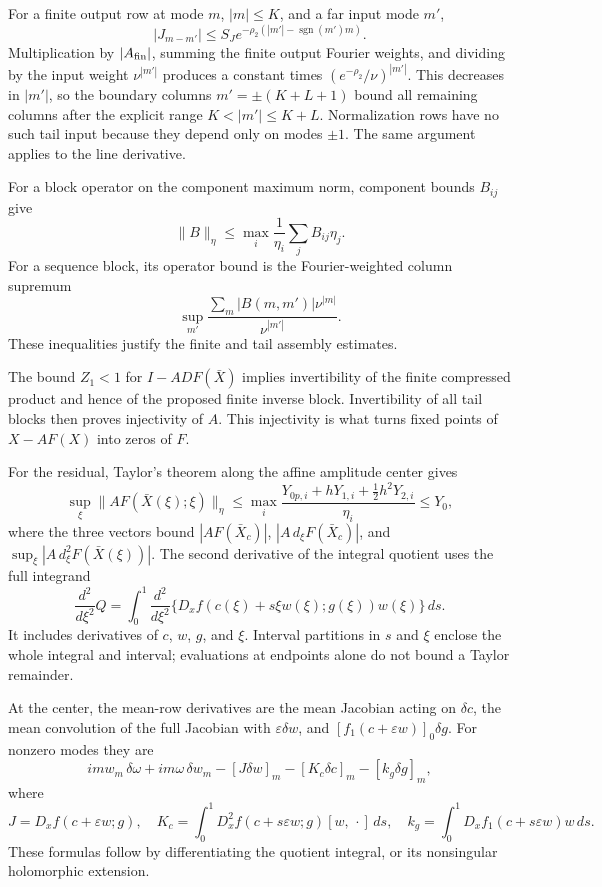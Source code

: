 \documentclass[11pt]{article}
\theoremstyle{definition}
\begin{document}
For a finite output row at mode $m$, $|m|\le K$, and a far input mode $m'$,
\[
 |J_{m-m'}|\le S_J
  e^{-\rho_2(|m'|-\operatorname{sgn}(m')m)}.
\]
Multiplication by $|A_{\rm fin}|$, summing the finite output Fourier weights, and dividing by the input weight $\nu^{|m'|}$ produces a constant times $(e^{-\rho_2}/\nu)^{|m'|}$. This decreases in $|m'|$, so the boundary columns $m'=\pm(K+L+1)$ bound all remaining columns after the explicit range $K<|m'|\le K+L$. Normalization rows have no such tail input because they depend only on modes $\pm1$. The same argument applies to the line derivative.

For a block operator on the component maximum norm, component bounds $B_{ij}$ give
\[
 \|B\|_\eta\le\max_i\frac1{\eta_i}\sum_jB_{ij}\eta_j.
\]
For a sequence block, its operator bound is the Fourier-weighted column supremum
\[
 \sup_{m'}\frac{\sum_m|B(m,m')|\nu^{|m|}}{\nu^{|m'|}}.
\]
These inequalities justify the finite and tail assembly estimates.

The bound $Z_1<1$ for $I-ADF(\bar X)$ implies invertibility of the finite compressed product and hence of the proposed finite inverse block. Invertibility of all tail blocks then proves injectivity of $A$. This injectivity is what turns fixed points of $X-AF(X)$ into zeros of $F$.

For the residual, Taylor's theorem along the affine amplitude center gives
\[
 \sup_{\xi}\|AF(\bar X(\xi);\xi)\|_\eta
 \le \max_i\frac{Y_{0p,i}+hY_{1,i}
                       +\frac12h^2Y_{2,i}}{\eta_i}\le Y_0,
\]
where the three vectors bound $|AF(\bar X_c)|$,
$|A\,d_\xi F(\bar X_c)|$, and
$\sup_\xi|A\,d_\xi^2F(\bar X(\xi))|$.
The second derivative of the integral quotient uses the full integrand
\[
 \frac{d^2}{d\xi^2}Q
 =\int_0^1\frac{d^2}{d\xi^2}
   \{D_xf(c(\xi)+s\xi w(\xi);g(\xi))w(\xi)\}\,ds.
\]
It includes derivatives of $c$, $w$, $g$, and $\xi$. Interval partitions in $s$ and $\xi$ enclose the whole integral and interval; evaluations at endpoints alone do not bound a Taylor remainder.

At the center, the mean-row derivatives are the mean Jacobian acting on $\delta c$, the mean convolution of the full Jacobian with $\varepsilon\delta w$, and $[f_1(c+\varepsilon w)]_0\delta g$. For nonzero modes they are
\[
 imw_m\,\delta\omega+im\omega\,\delta w_m
       -[J\delta w]_m-[K_c\delta c]_m-[k_g\delta g]_m,
\]
where
\[
 J=D_xf(c+\varepsilon w;g),\quad
 K_c=\int_0^1D_x^2f(c+s\varepsilon w;g)[w,\,\cdot]\,ds,
 \quad k_g=\int_0^1D_xf_1(c+s\varepsilon w)w\,ds.
\]
These formulas follow by differentiating the quotient integral, or its nonsingular holomorphic extension.
\end{document}
